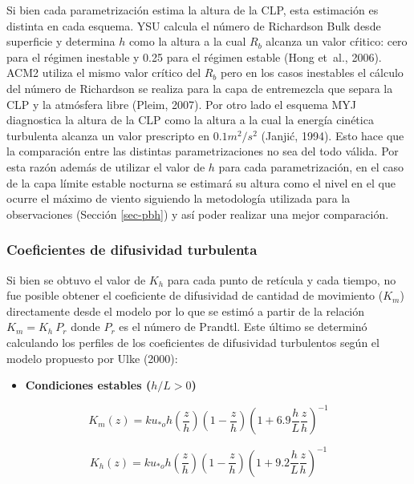\documentclass[12pt,spanish,oneside, a4paper]{book}
\providecommand{\tightlist}{%
  \setlength{\itemsep}{0pt}\setlength{\parskip}{0pt}}
\begin{document}
Si bien cada parametrización estima la altura de la CLP, esta estimación
es distinta en cada esquema. YSU calcula el número de Richardson Bulk
desde superficie y determina \(h\) como la altura a la cual \(R_b\)
alcanza un valor cŕitico: cero para el régimen inestable y 0.25 para el
régimen estable (Hong et~al., 2006). ACM2 utiliza el mismo valor crítico
del \(R_b\) pero en los casos inestables el cálculo del número de
Richardson se realiza para la capa de entremezcla que separa la CLP y la
atmósfera libre (Pleim, 2007). Por otro lado el esquema MYJ diagnostica
la altura de la CLP como la altura a la cual la energía cinética
turbulenta alcanza un valor prescripto en \(0.1 m^2/s^2\) (Janjić,
1994). Esto hace que la comparación entre las distintas
parametrizaciones no sea del todo válida. Por esta razón además de
utilizar el valor de \(h\) para cada parametrización, en el caso de la
capa límite estable nocturna se estimará su altura como el nivel en el
que ocurre el máximo de viento siguiendo la metodología utilizada para
la observaciones (Sección \ref{sec-pbh}) y así poder realizar una mejor
comparación.

\subsubsection{Coeficientes de difusividad
turbulenta}\label{coeficientes-de-difusividad-turbulenta}

Si bien se obtuvo el valor de \(K_h\) para cada punto de retícula y cada
tiempo, no fue posible obtener el coeficiente de difusividad de cantidad
de movimiento (\(K_m\)) directamente desde el modelo por lo que se
estimó a partir de la relación \(K_m = K_h \: P_r\) donde \(P_r\) es el
número de Prandtl. Este último se determinó calculando los perfiles de
los coeficientes de difusividad turbulentos según el modelo propuesto
por Ulke (2000):

\begin{itemize}
\tightlist
\item
  \textbf{Condiciones estables (\(h/L > 0\))}
\end{itemize}

\begin{equation} \label{k-1}
K_m(z) =  ku_{*o}h\left (\frac{z}{h} \right )\left(1-\frac{z}{h} \right)\left (1 + 6.9\frac{h}{L}\frac{z}{h} \right)^{-1}
\end{equation}

\begin{equation} \label{k-2}
K_h(z) =  ku_{*o}h\left (\frac{z}{h} \right )\left(1-\frac{z}{h} \right)\left (1 + 9.2\frac{h}{L}\frac{z}{h} \right)^{-1}
\end{equation}
\end{document}
